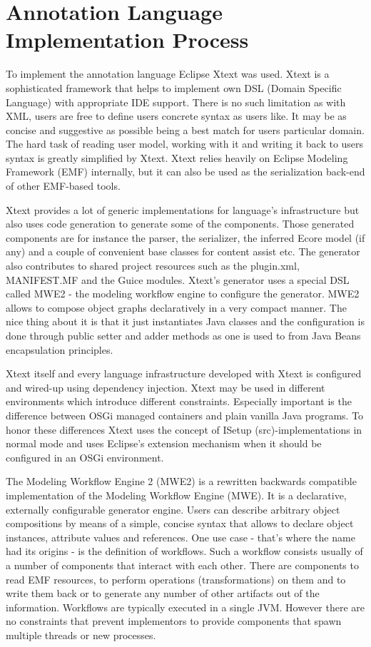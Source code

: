\section{Annotation Language Implementation Process}

To implement the annotation language Eclipse Xtext \cite{ref_17_xtext:grammar} was used. Xtext is a sophisticated framework that helps to implement own DSL (Domain Specific Language) with appropriate IDE support. There is no such limitation as with XML, users are free to define users concrete syntax as users like. It may be as concise and suggestive as possible being a best match for users particular domain. The hard task of reading user model, working with it and writing it back to users syntax is greatly simplified by Xtext. Xtext relies heavily on Eclipse Modeling Framework (EMF) internally, but it can also be used as the serialization back-end of other EMF-based tools.  

Xtext provides a lot of generic implementations for language's infrastructure but also uses code generation to generate some of the components. Those generated components are for instance the parser, the serializer, the inferred Ecore model (if any) and a couple of convenient base classes for content assist etc. The generator also contributes to shared project resources such as the plugin.xml, MANIFEST.MF and the Guice modules. Xtext's generator uses a special DSL called MWE2 - the modeling workflow engine to configure the generator. MWE2 allows to compose object graphs declaratively in a very compact manner. The nice thing about it is that it just instantiates Java classes and the configuration is done through public setter and adder methods as one is used to from Java Beans encapsulation principles.

Xtext itself and every language infrastructure developed with Xtext is configured and wired-up using dependency injection. Xtext may be used in different environments which introduce different constraints. Especially important is the difference between OSGi managed containers and plain vanilla Java programs. To honor these differences Xtext uses the concept of ISetup (src)-implementations in normal mode and uses Eclipse's extension mechanism when it should be configured in an OSGi environment.

The Modeling Workflow Engine 2 (MWE2) is a rewritten backwards compatible implementation of the Modeling Workflow Engine (MWE). It is a declarative, externally configurable generator engine. Users can describe arbitrary object compositions by means of a simple, concise syntax that allows to declare object instances, attribute values and references. One use case - that's where the name had its origins - is the definition of workflows. Such a workflow consists usually of a number of components that interact with each other. There are components to read EMF resources, to perform operations (transformations) on them and to write them back or to generate any number of other artifacts out of the information. Workflows are typically executed in a single JVM. However there are no constraints that prevent implementors to provide components that spawn multiple threads or new processes.

